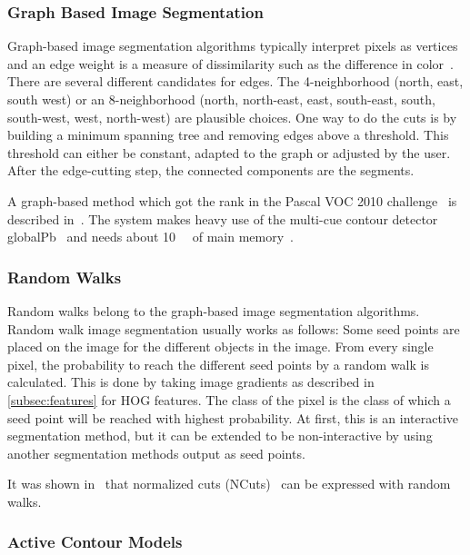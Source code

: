\subsubsection{Graph Based Image Segmentation}%
\label{subsec:graph-based-image-segmentation}%
Graph-based image segmentation algorithms typically interpret pixels as
vertices and an edge weight is a measure of dissimilarity such as the
difference in color~\cite{felzenszwalb2004efficient,FelzenszwalbGraphCode}.
There are several different candidates for edges. The 4-neighborhood (north,
east, south west) or an 8-neighborhood (north, north-east, east, south-east,
south, south-west, west, north-west) are plausible choices.
One way to do the cuts is by building a minimum spanning tree and removing
edges above a threshold. This threshold can either be constant, adapted to the
graph or adjusted by the user. After the edge-cutting step, the connected
components are the segments.

A graph-based method which got the  rank in the Pascal VOC 2010
challenge~\cite{everingham2010pascal} is described
in~\cite{carreira2010constrained}. The system makes heavy use of the multi-cue
contour detector globalPb~\cite{4587420} and needs about \SI{10}{\giga\byte}
of main memory~\cite{Carreira2011}.


\subsubsection{Random Walks}

Random walks belong to the graph-based image segmentation algorithms. Random
walk image segmentation usually works as follows: Some seed points are placed
on the image for the different objects in the image. From every single pixel,
the probability to reach the different seed points by a random walk is
calculated. This is done by taking image gradients as described in
\cref{subsec:features} for \gls{HOG} features. The class of the pixel is the
class of which a seed point will be reached with highest probability. At first,
this is an interactive segmentation method, but it can be extended to be
non-interactive by using another segmentation methods output as seed points.

It was shown in~\cite{meilpa2001learning} that normalized cuts
(NCuts)~\cite{shi2000normalized} can be expressed with random walks.


\subsubsection{Active Contour Models}

